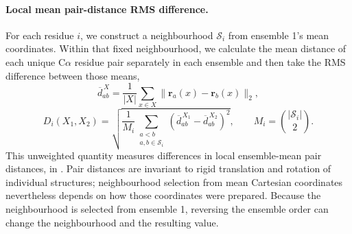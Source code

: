 \paragraph{Local mean pair-distance RMS difference.}
For each residue $i$, we construct a neighbourhood $\mathcal S_i$ from ensemble 1's mean coordinates. Within that fixed neighbourhood, we calculate the mean distance of each unique C$\alpha$ residue pair separately in each ensemble and then take the RMS difference between those means,
\begin{equation}
    \overline d_{ab}^{\,X}=\frac{1}{|X|}
    \sum_{x\in X}\lVert\mathbf r_a(x)-\mathbf r_b(x)\rVert_2,
    \label{eq:valdx-mean-pair-distance}
\end{equation}
\begin{equation}
    D_i(X_1,X_2)=
    \sqrt{\frac{1}{M_i}
    \sum_{\substack{a<b\\a,b\in\mathcal S_i}}
    \left(\overline d_{ab}^{\,X_1}-\overline d_{ab}^{\,X_2}\right)^2},
    \qquad M_i=\binom{|\mathcal S_i|}{2}.
    \label{eq:valdx-pair-rms}
\end{equation}
This unweighted quantity measures differences in local ensemble-mean pair distances, in \text{\AA}. Pair distances are invariant to rigid translation and rotation of individual structures; neighbourhood selection from mean Cartesian coordinates nevertheless depends on how those coordinates were prepared. Because the neighbourhood is selected from ensemble 1, reversing the ensemble order can change the neighbourhood and the resulting value.

